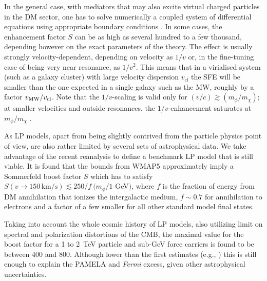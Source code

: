 \documentclass[10pt,aps,pra,reprint,amsmath,amsfonts,amssymb,showpacs,nofootinbib,floatfix]{revtex4-1}
\newcommand{\Fermi}{{\em Fermi}\xspace}
\newcommand{\rmn}{\mathrm}
\newcommand{\sigv}{v_\rmn{cl}}
\begin{document}
In the general case, with mediators that may also excite virtual
charged particles in the DM sector, one has to solve numerically a
coupled system of differential equations using appropriate boundary
conditions
\cite{2005PhRvD..71f3528H,2007NuPhB.787..152C,2009PhRvD..79a5014A}. In
some cases, the enhancement factor $S$ can be as high as several
hundred to a few thousand, depending however on the exact parameters
of the theory. The effect is usually strongly velocity-dependent,
depending on velocity as $1/v$ or, in the fine-tuning case of being
very near resonance, as $1/v^2$. This means that in a virialised
system (such as a galaxy cluster) with large velocity dispersion
$\sigv$ the SFE will be smaller than the one expected in a single
galaxy such as the MW, roughly by a factor $v_{\rm MW}/\sigv$. Note
that the $1/v$-scaling is valid only for $(v/c) \gtrsim
(m_\phi/m_\chi)$; at smaller velocities and outside resonances, the
$1/v$-enhancement saturates at $m_\phi/m_\chi$
\cite{2008PhRvL.101z1301K}.

As LP models, apart from being slightly contrived from the particle
physics point of view, are also rather limited by several sets of
astrophysical data. We take advantage of the recent reanalysis
\cite{Finkbeiner:2010sm} to define a benchmark LP model that is still
viable. It is found that the bounds from WMAP5 approximately imply a
Sommerfeld boost factor $S$ which has to satisfy $S(v\to
150\,\rmn{km}/\rmn{s})\lesssim 250/f\ (m_\phi/1$ GeV$)$, where $f$ is
the fraction of energy from DM annihilation that ionizes the
intergalactic medium, $f\sim 0.7$ for annihilation to electrons and a
factor of a few smaller for all other standard model final states.

Taking into account the whole cosmic history of LP models, also
utilizing limit on spectral and polarization distortions of the CMB,
the maximal value for the boost factor for a 1 to 2~TeV particle and
sub-GeV force carriers is found to be \cite{Finkbeiner:2010sm} between
400 and 800. Although lower than the first estimates (e.g.,
\cite{Bergstrom:2009fa,Meade:2009iu}) this is still enough to explain
the PAMELA and \Fermi excess, given other astrophysical uncertainties.
\end{document}
